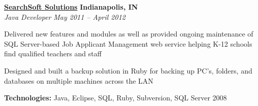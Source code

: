 %
    \headerrow
        {\textbf{\href{http://www.searchsoft.net/}{SearchSoft Solutions}}}
        {\textbf{Indianapolis, IN}}
    \\
    \headerrow
        {\emph{Java Developer}}
        {\emph{May 2011 -- April 2012}}
    \begin{itemize*}
        \item Delivered new features and modules as well as provided ongoing maintenance of SQL Server-based
                Job Applicant Management web service helping K-12 schools find qualified teachers and staff
        \item Designed and built a backup solution in Ruby for backing up PC's, folders, and databases on multiple
                machines across the LAN
    \end{itemize*}

    \hspace{1.0em}
    \textbf{Technologies:} Java, Eclipse, SQL, Ruby, Subversion, SQL Server 2008
